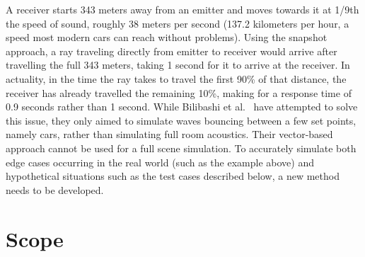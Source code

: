 A receiver starts 343 meters away from an emitter and moves towards it at 1/9th the speed of sound, roughly 38 meters per second
(137.2 kilometers per hour, a speed most modern cars can reach without problems).
\newline
Using the snapshot approach, a ray traveling directly from emitter to receiver would arrive after travelling the full 343 meters,
taking 1 second for it to arrive at the receiver.
In actuality, in the time the ray takes to travel the first 90\% of that distance,
the receiver has already travelled the remaining 10\%, making for a response time of 0.9 seconds rather than 1 second.
\newline
While Bilibashi et al.~\cite{BVD20} have attempted to solve this issue,
they only aimed to simulate waves bouncing between a few set points, namely cars,
rather than simulating full room acoustics.
Their vector-based approach cannot be used for a full scene simulation.
\newline
To accurately simulate both edge cases occurring in the real world (such as the example above)
and hypothetical situations such as the test cases described below,
a new method needs to be developed.

\section{Scope}

